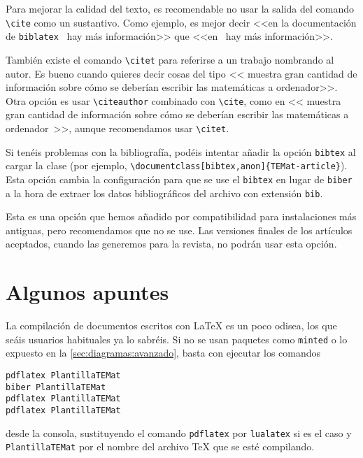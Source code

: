 \documentclass[bibtex, anon]{TEMat-article}
\begin{document}
\begin{nota}
Para mejorar la calidad del texto, es recomendable no usar la salida del comando \verb+\cite+ como un sustantivo.
Como ejemplo, es mejor decir <<en la documentación de \texttt{biblatex}~\cite{biblatex} hay más información>> que <<en~\cite{biblatex} hay más información>>.

También existe el comando \verb+\citet+ para referirse a un trabajo nombrando al autor.
Es bueno cuando quieres decir cosas del tipo <<\citet{bezosOM} muestra gran cantidad de información sobre cómo se deberían escribir las matemáticas a ordenador>>. Otra opción es usar \verb+\citeauthor+ combinado con \verb+\cite+, como en <<\citeauthor{bezosOM} muestra gran cantidad de información sobre cómo se deberían escribir las matemáticas a ordenador~\cite{bezosOM}>>, aunque recomendamos usar \verb+\citet+.
\end{nota}

\begin{nota}
Si tenéis problemas con la bibliografía, podéis intentar añadir la opción \verb+bibtex+ al cargar la clase (por ejemplo, \verb+\documentclass[bibtex,anon]{TEMat-article}+).
Esta opción cambia la configuración para que se use el  \verb+bibtex+ en lugar de \verb+biber+ a la hora de extraer los datos bibliográficos del archivo con extensión \verb+bib+.

Esta es una opción que hemos añadido por compatibilidad para instalaciones más antiguas, pero recomendamos que no se use.
Las versiones finales de los artículos aceptados, cuando las generemos para la revista, no podrán usar esta opción.
\end{nota}

\section{Algunos apuntes}\label{sec:apuntes}
La compilación de documentos escritos con \LaTeX{} es un poco odisea, los que seáis usuarios habituales ya lo sabréis.
Si no se usan paquetes como \verb+minted+ o lo expuesto en la \cref{sec:diagramas:avanzado}, basta con ejecutar los comandos
\begin{verbatim}
pdflatex PlantillaTEMat
biber PlantillaTEMat
pdflatex PlantillaTEMat
pdflatex PlantillaTEMat
\end{verbatim}
desde la consola, sustituyendo el comando \verb+pdflatex+ por \verb+lualatex+ si es el caso y \verb+PlantillaTEMat+ por el nombre del archivo \TeX{} que se esté compilando.
\end{document}

